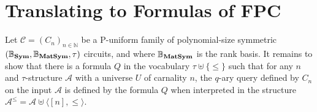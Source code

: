 \documentclass[12pt]{report}
\newtheorem{lem}[thm]{Lemma} \newtheorem{prop}[thm]{Proposition}
\newcommand{\MB}{\mathbb{B}_{\matsym}} %
\newcommand{\SB}{\mathbb{B}_{\sym}} %
\newcommand{\sym}{\text{\textbf{Sym}}}
\newcommand{\dom}{\text{\textbf{Dom}}}
\newcommand{\consp}{\text{sp}}
\newcommand{\EV}{\text{EV}}
\newcommand{\matsym}{\text{\textbf{MatSym}}}
\begin{document}






\section{Translating to Formulas of FPC}
Let $\mathcal{C} = (C_n)_{n \in \mathbb{N}}$ be a P-uniform family of
polynomial-size symmetric $(\SB, \MB, \tau)$ circuits, and where $\MB$ is the
rank basis. It remains to show that there is a formula $Q$ in the vocabulary
$\tau \uplus \{\leq\}$ such that for any $n$ and $\tau$-structure $\mathcal{A}$
with a universe $U$ of carnality $n$, the $q$-ary query defined by $C_n$ on the
input $\mathcal{A}$ is defined by the formula $Q$ when interpreted in the
structure $\mathcal{A}^\leq = \mathcal{A} \uplus \langle [n], \leq \rangle$.
\end{document}
